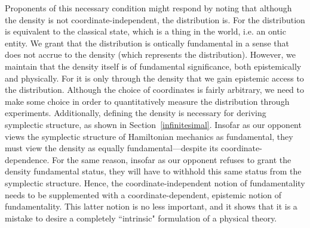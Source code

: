 \documentclass[letterpaper]{article}
\begin{document}
Proponents of this necessary condition might respond by noting that although the density is not coordinate-independent, the distribution is. For the distribution is equivalent to the classical state, which is a thing in the world, i.e. an ontic entity. We grant that the distribution is ontically fundamental in a sense that does not accrue to the density (which represents the distribution). However, we maintain that the density itself is of fundamental significance, both epistemically and physically. For it is only through the density that we gain epistemic access to the distribution. Although the choice of coordinates is fairly arbitrary, we need to make some choice in order to quantitatively measure the distribution through experiments. Additionally, defining the density is necessary for deriving symplectic structure, as shown in Section~\ref{infinitesimal}. Insofar as our opponent views the symplectic structure of Hamiltonian mechanics as fundamental, they must view the density as equally fundamental---despite its coordinate-dependence. For the same reason, insofar as our opponent refuses to grant the density fundamental status, they will have to withhold this same status from the symplectic structure. Hence, the coordinate-independent notion of fundamentality needs to be supplemented with a coordinate-dependent, epistemic notion of fundamentality. This latter notion is no less important, and it shows that it is a mistake to desire a completely ``intrinsic" formulation of a physical theory.
\end{document}
